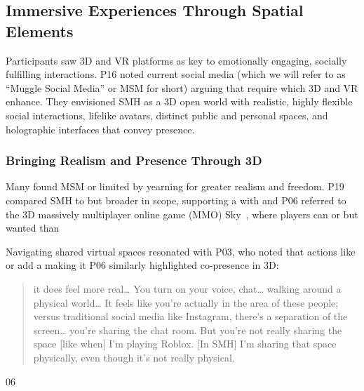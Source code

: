 \subsection{Immersive Experiences Through Spatial Elements}
\label{lab:4-1}
Participants saw 3D and VR platforms as key to emotionally engaging, socially fulfilling interactions. P16 noted current social media (which we will refer to as ``Muggle Social Media'' or MSM for short) arguing that require which 3D and VR enhance. They envisioned SMH as a 3D open world with realistic, highly flexible social interactions, lifelike avatars, distinct public and personal spaces, and holographic interfaces that convey presence.


\subsubsection{Bringing Realism and Presence Through 3D}
\label{lab:4-1-1}
Many found MSM or limited by yearning for greater realism and freedom. P19 compared SMH to but broader in scope, supporting a  with  and  P06 referred to the 3D massively multiplayer online game (MMO) Sky~\cite{sky}, where players can  or  but wanted  than 

Navigating shared virtual spaces resonated with P03, who noted that actions like  or  add a  making it  P06 similarly highlighted co-presence in 3D: \blockquote{it does feel more real\ldots{} You turn on your voice, chat\ldots{} walking around a physical world\ldots{} It feels like you're actually in the area of these people; versus traditional social media like Instagram, there's a separation of the screen\dots{} you're sharing the chat room. But you're not really sharing the space [like when] I'm playing Roblox. [In SMH] I'm sharing that space physically, even though it's not really physical.}{06}

